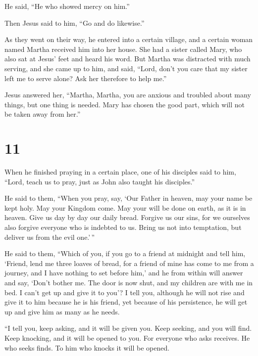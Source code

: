  He said, ``He who showed mercy on him.''

Then Jesus said to him, ``Go and do likewise.''

 As they went on their way, he entered into a certain
village, and a certain woman named Martha received him into her house.
 She had a sister called Mary, who also sat at Jesus'
feet and heard his word.  But Martha was distracted with
much serving, and she came up to him, and said, ``Lord, don't you care
that my sister left me to serve alone? Ask her therefore to help me.''

 Jesus answered her, ``Martha, Martha, you are anxious
and troubled about many things,  but one thing is needed.
Mary has chosen the good part, which will not be taken away from her.''

\hypertarget{section-10}{%
\section{11}\label{section-10}}

 When he finished praying in a certain place, one of his
disciples said to him, ``Lord, teach us to pray, just as John also
taught his disciples.''

 He said to them, ``When you pray, say, `Our Father in
heaven, may your name be kept holy. May your Kingdom come. May your will
be done on earth, as it is in heaven.  Give us day by day
our daily bread.  Forgive us our sins, for we ourselves
also forgive everyone who is indebted to us. Bring us not into
temptation, but deliver us from the evil one.'\,''

 He said to them, ``Which of you, if you go to a friend at
midnight and tell him, `Friend, lend me three loaves of bread,
 for a friend of mine has come to me from a journey, and I
have nothing to set before him,'  and he from within will
answer and say, `Don't bother me. The door is now shut, and my children
are with me in bed. I can't get up and give it to you'?  I
tell you, although he will not rise and give it to him because he is his
friend, yet because of his persistence, he will get up and give him as
many as he needs.

 ``I tell you, keep asking, and it will be given you. Keep
seeking, and you will find. Keep knocking, and it will be opened to you.
 For everyone who asks receives. He who seeks finds. To
him who knocks it will be opened.

